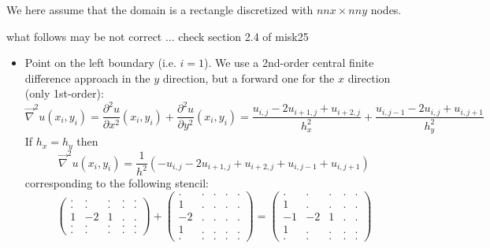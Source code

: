We here assume that the domain is a rectangle discretized with $nnx\times nny$ nodes.

{\color{red} what follows may be not correct ... check section 2.4 of misk25}


\begin{itemize}

\item Point on the left boundary (i.e. $i=1$). We use a 2nd-order central finite difference 
approach in the $y$ direction, but a forward one for the $x$ direction (only 1st-order):
\[
\vec\nabla^2 u (x_i,y_i)= \frac{\partial^2 u}{\partial x^2}(x_i,y_i)+
\frac{\partial^2 u}{\partial y^2}(x_i,y_i)
= 
\frac{u_{i,j} -2u_{i+1,j} +u_{i+2,j}}{h_x^2} + \frac{u_{i,j-1} -2u_{i,j} +u_{i,j+1}}{h_y^2}
\]
If $h_x=h_y$ then
\[
\vec\nabla^2 u (x_i,y_i)= \frac{1}{h^2}
\left(
-u_{i,j} -2u_{i+1,j} +u_{i+2,j} + u_{i,j-1}  +u_{i,j+1}
\right)
\]
corresponding to the following stencil:
\[
\begin{pmatrix}
. & . &  . & . & . \\
. & . &  . & . & . \\
1 & -2 & 1 & . & . \\
. & . &  . & . & . \\
. & . &  . & . & . 
\end{pmatrix}
+
\begin{pmatrix}
. & . &  . & . & . \\
1 & . &  . & . & . \\
-2 & . &  . & . & . \\
1 & . &  . & . & . \\
. & . &  . & . & . 
\end{pmatrix}
=
\begin{pmatrix}
. & . &  . & . & . \\
1 & . &  . & . & . \\
-1 & -2 & 1 & . & . \\
1 & . &  . & . & . \\
. & . &  . & . & . 
\end{pmatrix}
\]



\end{itemize}
